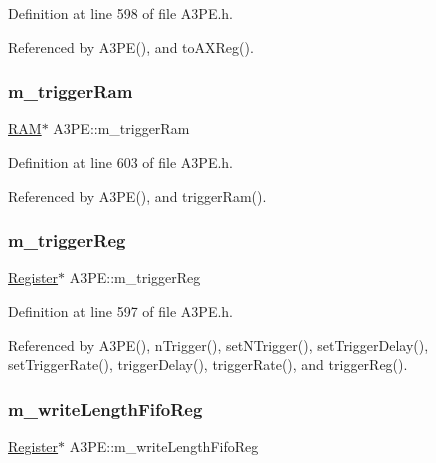 Definition at line 598 of file A3\+P\+E.\+h.



Referenced by A3\+P\+E(), and to\+A\+X\+Reg().

\mbox{\label{classA3PE_a2b40e3937f0aa008ec7073acc5029fcc}} 
\subsubsection{\texorpdfstring{m\+\_\+trigger\+Ram}{m\_triggerRam}}
{\footnotesize\ttfamily \hyperlink{classRAM}{R\+AM}$\ast$ A3\+P\+E\+::m\+\_\+trigger\+Ram\hspace{0.3cm}{\ttfamily [private]}}



Definition at line 603 of file A3\+P\+E.\+h.



Referenced by A3\+P\+E(), and trigger\+Ram().

\mbox{\label{classA3PE_a750158ae488121ab7969452f061e678c}} 
\subsubsection{\texorpdfstring{m\+\_\+trigger\+Reg}{m\_triggerReg}}
{\footnotesize\ttfamily \hyperlink{classRegister}{Register}$\ast$ A3\+P\+E\+::m\+\_\+trigger\+Reg\hspace{0.3cm}{\ttfamily [private]}}



Definition at line 597 of file A3\+P\+E.\+h.



Referenced by A3\+P\+E(), n\+Trigger(), set\+N\+Trigger(), set\+Trigger\+Delay(), set\+Trigger\+Rate(), trigger\+Delay(), trigger\+Rate(), and trigger\+Reg().

\mbox{\label{classA3PE_a9a0cb2253ea34c0be567a03684217fee}} 
\subsubsection{\texorpdfstring{m\+\_\+write\+Length\+Fifo\+Reg}{m\_writeLengthFifoReg}}
{\footnotesize\ttfamily \hyperlink{classRegister}{Register}$\ast$ A3\+P\+E\+::m\+\_\+write\+Length\+Fifo\+Reg\hspace{0.3cm}{\ttfamily [private]}}




